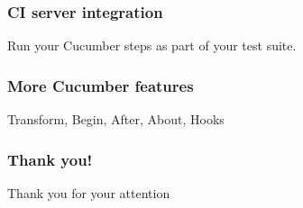 \documentclass[10pt]{vcs_beamer}
\begin{document}
\begin{frame}
    \frametitle{CI server integration}
    Run your Cucumber steps as part of your test suite.
\end{frame}

\begin{frame}
    \frametitle{More Cucumber features}
    Transform, Begin, After, About, Hooks
\end{frame}

\begin{frame}
\frametitle{Thank you!}

\vspace*{2cm}
\begin{center}
    \LARGE
Thank you for your attention \ttt{:-)}
\end{center}

\end{frame}
\end{document}
